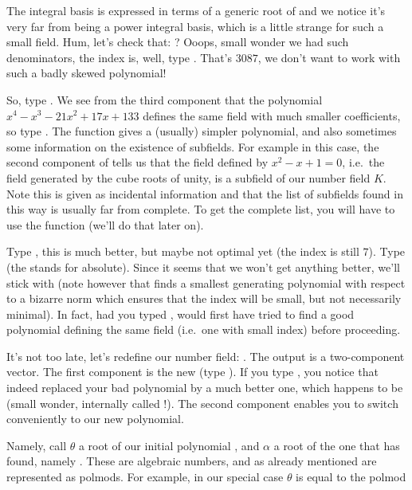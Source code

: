 The integral basis is expressed in terms of a generic root  of 
and we notice it's very far from being a power integral basis, which is a
little strange for such a small field. Hum, let's check that: ?
Ooops, small wonder we had such denominators, the index is, well, type
. That's $3087$, we don't want to work with such
a badly skewed polynomial!

  So, type . We see from the third component that the
polynomial $x^4-x^3-21x^2+17x+133$ defines the same field with much smaller
coefficients, so type . The  function gives a
(usually) simpler polynomial, and also sometimes some information on the
existence of subfields. For example in this case, the second component of
 tells us that the field defined by $x^2-x+1=0$, i.e.~the field
generated by the cube roots of unity, is a subfield of our number field $K$.
Note this is given as incidental information and that the list of subfields
found in this way is usually far from complete. To get the complete list, you
will have to use the function  (we'll do that later on).

  Type , this is much better, but maybe not optimal yet
(the index is still $7$). Type  (the  stands for
absolute). Since it seems that we won't get anything better, we'll stick with
 (note however that  finds a smallest generating
polynomial with respect to a bizarre norm which ensures that the index will
be small, but not necessarily minimal). In fact, had you typed
,  would first have tried to find a good
polynomial defining the same field (i.e.~one with small index) before
proceeding.

  It's not too late, let's redefine our number field: .
The output is a two-component vector. The first component is the new
 (type ). If you type , you notice that 
indeed replaced your bad polynomial  by a much better one, which
happens to be  (small wonder,  internally called
!). The second component enables you to switch conveniently to
our new polynomial.

Namely, call $\theta$ a root of our initial polynomial , and $\alpha$
a root of the one that  has found, namely . These are
algebraic numbers, and as already mentioned are represented as polmods. For
example, in our special case $\theta$ is equal to the polmod

